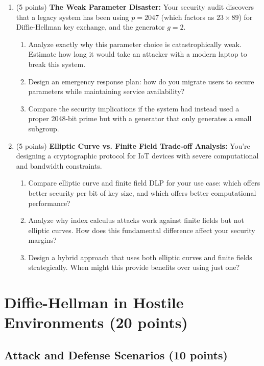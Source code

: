 \documentclass[10pt,a4paper,american]{article}
\begin{document}
\begin{enumerate}
	\item (5 points) \textbf{The Weak Parameter Disaster:}
	      Your security audit discovers that a legacy system has been using $p = 2047$ (which factors as $23 \times 89$) for Diffie-Hellman key exchange, and the generator $g = 2$.
	      \begin{enumerate}
		      \item Analyze exactly why this parameter choice is catastrophically weak. Estimate how long it would take an attacker with a modern laptop to break this system.
		      \item Design an emergency response plan: how do you migrate users to secure parameters while maintaining service availability?
		      \item Compare the security implications if the system had instead used a proper 2048-bit prime but with a generator that only generates a small subgroup.
	      \end{enumerate}
	\item (5 points) \textbf{Elliptic Curve vs. Finite Field Trade-off Analysis:}
	      You're designing a cryptographic protocol for IoT devices with severe computational and bandwidth constraints.
	      \begin{enumerate}
		      \item Compare elliptic curve and finite field DLP for your use case: which offers better security per bit of key size, and which offers better computational performance?
		      \item Analyze why index calculus attacks work against finite fields but not elliptic curves. How does this fundamental difference affect your security margins?
		      \item Design a hybrid approach that uses both elliptic curves and finite fields strategically. When might this provide benefits over using just one?
	      \end{enumerate}
\end{enumerate}

\section{Diffie-Hellman in Hostile Environments (20 points)}

\subsection{Attack and Defense Scenarios (10 points)}
\end{document}
